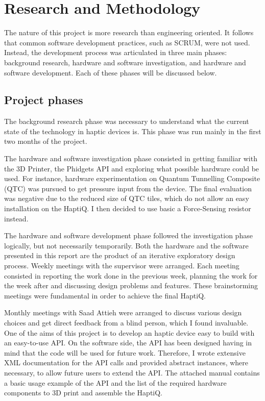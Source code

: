 \chapter{Research and Methodology}

The nature of this project is more research than engineering oriented. It follows that common software development practices, such as SCRUM, were not used. Instead, the development process was articulated in three main phases: background research, hardware and software investigation, and hardware and software development. Each of these phases will be discussed below. 

\section{Project phases}
The background research phase was necessary to understand what the current state of the technology in haptic devices is. This phase was run mainly in the first two months of the project. 

The hardware and software investigation phase consisted in getting familiar with the 3D Printer, the Phidgets API and exploring what possible hardware could be used. For instance, hardware experimentation on Quantum Tunnelling Composite (QTC) was pursued to get pressure input from the device. The final evaluation was negative due to the reduced size of QTC tiles, which do not allow an easy installation on the HaptiQ. I then decided to use basic a Force-Sensing resistor instead. 

The hardware and software development phase followed the investigation phase logically, but not necessarily temporarily. Both the hardware and the software presented in this report are the product of an iterative exploratory design process. Weekly meetings with the supervisor were arranged. Each meeting consisted in reporting the work done in the previous week, planning the work for the week after and discussing design problems and features. These brainstorming meetings were fundamental in order to achieve the final HaptiQ.

Monthly meetings with Saad Attieh were arranged to discuss various design choices and get direct feedback from a blind person, which I found invaluable. 
One of the aims of this project is to develop an haptic device easy to build with an easy-to-use API. On the software side, the API has been designed having in mind that the code will be used for future work. Therefore, I wrote extensive XML documentation for the API calls and provided abstract instances, where necessary, to allow future users to extend the API. The attached manual contains a basic usage example of the API and the list of the required hardware components to 3D print and assemble the HaptiQ. 

